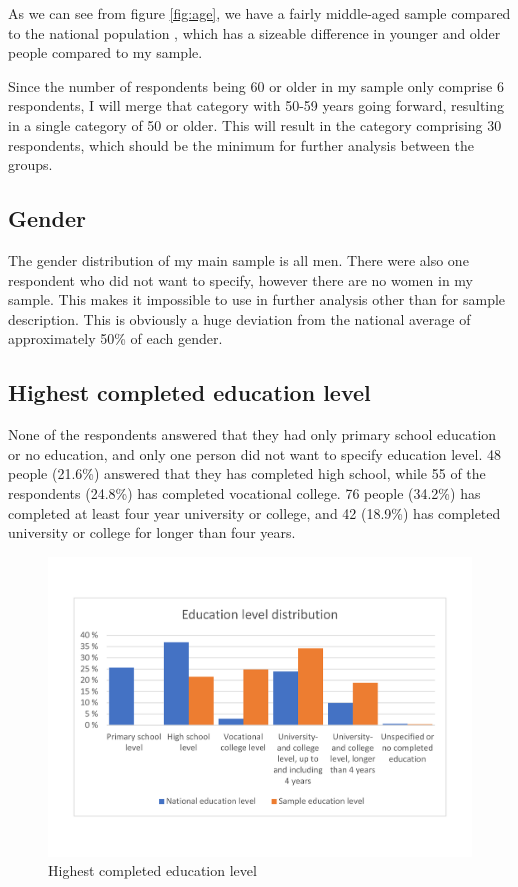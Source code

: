 As we can see from figure \ref{fig:age}, we have a fairly middle-aged sample compared to the national population \cite{SSB_befolkning}, which has a sizeable difference in younger and older people compared to my sample. 

Since the number of respondents being 60 or older in my sample only comprise 6 respondents, I will merge that category with 50-59 years going forward, resulting in a single category of 50 or older. This will result in the category comprising 30 respondents, which should be the minimum for further analysis between the groups. 

\subsection{Gender}
\label{subsec:gender}
The gender distribution of my main sample is all men. There were also one respondent who did not want to specify, however there are no women in my sample. This makes it impossible to use in further analysis other than for sample description. This is obviously a huge deviation from the national average of approximately 50\% of each gender. 


\subsection{Highest completed education level}
None of the respondents answered that they had only primary school education or no education, and only one person did not want to specify education level. 48 people (21.6\%) answered that they has completed high school, while 55 of the respondents (24.8\%) has completed vocational college. 76 people (34.2\%) has completed at least four year university or college, and 42 (18.9\%) has completed university or college for longer than four years. 
\begin{figure}[!h]
    \centering
    \includegraphics[scale=0.45]{figures/diagrams/education_ssb.pdf}
    \caption{Highest completed education level}
    \label{fig:education}
\end{figure}

